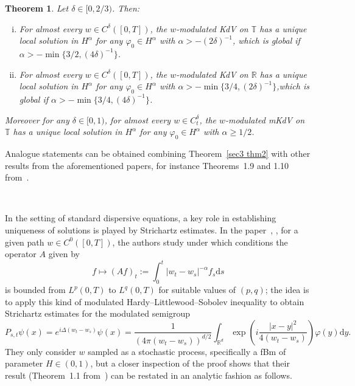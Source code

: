 \documentclass[10pt]{article}
\newcommand{\assign}{:=}
\newcommand{\mathd}{\mathrm{d}}
\newenvironment{enumerateroman}{\begin{enumerate}[i.] }{\end{enumerate}}
\newtheorem{theorem}{Theorem}
\begin{document}
\begin{theorem}
  \label{sec6 thm kdv}Let $\delta \in [0, 2 / 3)$. Then:
  \begin{enumerateroman}
    \item For almost every $w \in C^{\delta} ([0, T])$, the
    $w$\mbox{-}modulated KdV on $\mathbb{T}$ has a unique local solution in
    $H^{\alpha}$ for any $\varphi_0 \in H^{\alpha}$ with $\alpha > - (2
    \delta)^{- 1}$, which is global if $\alpha > - \min \{ 3 / 2, (4
    \delta)^{- 1} \}$.
    
    \item For almost every $w \in C^{\delta} ([0, T])$, the
    $w$\mbox{-}modulated KdV on $\mathbb{R}$ has a unique local solution in
    $H^{\alpha}$ for any $\varphi_0 \in H^{\alpha}$ with $\alpha > - \min \{ 3
    / 4, (2 \delta)^{- 1} \}$,which is global if $\alpha > - \min \{ 3 / 4, (4
    \delta)^{- 1} \}$.
  \end{enumerateroman}
  Moreover for any $\delta \in [0, 1)$, for almost every $w \in C^{\delta}_t$,
  the $w$\mbox{-}modulated mKdV on $\mathbb{T}$ has a unique local solution in
  $H^{\alpha}$ for any $\varphi_0 \in H^{\alpha}$ with $\alpha \geqslant 1 /
  2$.
\end{theorem}

Analogue statements can be obtained combining Theorem~\ref{sec3 thm2} with
other results from the aforementioned papers, for instance Theorems~1.9 and
1.10 from~{\cite{choukgubinelli1}}.

\

In the setting of standard dispersive equations, a key role in establishing
uniqueness of solutions is played by Strichartz estimates. In the
paper~{\cite{duboscq}}, , for a given path $w \in C^0 ([0, T])$, the authors
study under which conditions the operator $A$ given by
\[ f \mapsto (A f)_t \assign \int_0^t | w_t - w_s |^{- \alpha} f_s \mathd s \]
is bounded from $L^p (0, T)$ to $L^q (0, T)$ for suitable values of $(p, q)$;
the idea is to apply this kind of modulated Hardy--Littlewood--Sobolev
inequality to obtain Strichartz estimates for the modulated semigroup
\[ P_{s, t} \psi (x) = e^{i \Delta (w_t - w_s)} \psi (x) = \frac{1}{(4 \pi
   (w_t - w_s))^{d / 2}} \int_{\mathbb{R}^d} \exp \left( i \frac{| x - y
   |^2}{4 (w_t - w_s)} \right) \varphi (y) \mathd y. \]
They only consider $w$ sampled as a stochastic process, specifically a fBm of
parameter $H \in (0, 1)$, but a closer inspection of the proof shows that
their result (Theorem~1.1 from~{\cite{duboscq}}) can be restated in an
analytic fashion as follows.
\end{document}
